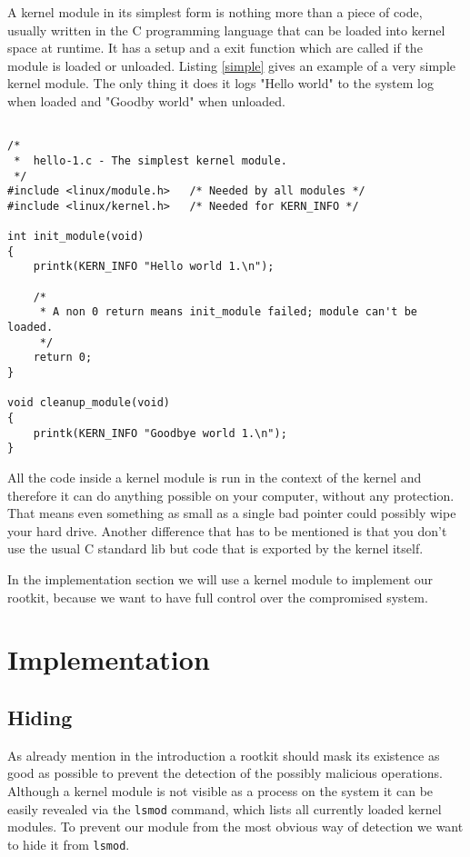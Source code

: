 \documentclass[12pt]{article}
\newcommand{\shellcmdinline}[1]{\texttt{\footnotesize #1}}
\begin{document}
A kernel module in its simplest form is nothing more than a piece of code, usually written in the C programming language that can be loaded into kernel space at runtime. It has a setup and a exit function which are called if the module is loaded or unloaded. Listing \ref{simple} gives an example of a very simple kernel module. The only thing it does it logs "Hello world" to the system log when loaded and "Goodby world" when unloaded.

\begin{lstlisting}[caption=Source: \url{http://www.tldp.org/LDP/lkmpg/2.6/html/x121.html}., label=simple]

/*  
 *  hello-1.c - The simplest kernel module.
 */
#include <linux/module.h>	/* Needed by all modules */
#include <linux/kernel.h>	/* Needed for KERN_INFO */

int init_module(void)
{
	printk(KERN_INFO "Hello world 1.\n");

	/* 
	 * A non 0 return means init_module failed; module can't be loaded. 
	 */
	return 0;
}

void cleanup_module(void)
{
	printk(KERN_INFO "Goodbye world 1.\n");
}

\end{lstlisting}

All the code inside a kernel module is run in the context of the kernel and therefore it can do anything possible on your computer, without any protection. That means even something as small as a single bad pointer could possibly wipe your hard drive. Another difference that has to be mentioned is that you don't use the usual C standard lib but code that is exported by the kernel itself. 

In the implementation section we will use a kernel module to implement our rootkit, because we want to have full control over the compromised system.

\section{Implementation}
\label{sec:impl}

\subsection{Hiding}
As already mention in the introduction a rootkit should mask its existence as good as possible to prevent the detection of the possibly malicious operations. Although a kernel module is not visible as a process on the system it can be easily revealed via the \shellcmdinline{lsmod} command, which lists all currently loaded kernel modules. To prevent our module from the most obvious way of detection we want to hide it from \shellcmdinline{lsmod}. 
\end{document}
